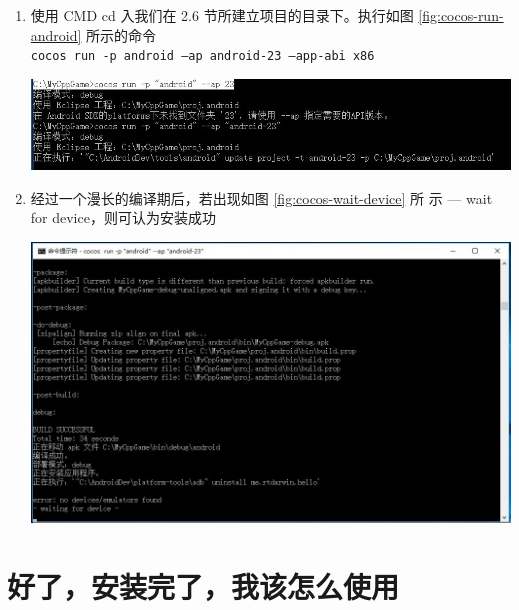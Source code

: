 \documentclass[a4paper, 10pt]{article}
\newcommand{\inlinecode}[1]{\colorbox{inlinecodecolor}{\texttt{#1}}}
\begin{document}
\begin{enumerate}
\item 使用 CMD cd 入我们在 2.6 节所建立项目的目录下。执行如图
  \ref{fig:cocos-run-android} 所示的命令\\
  \inlinecode{cocos run -p android --ap android-23 --app-abi x86}

  \begin{center}
    \includegraphics*[width=.8\textwidth]{images/cocos-run-android}
  \end{center}
  
\item 经过一个漫长的编译期后，若出现如图 \ref{fig:cocos-wait-device} 所
  示 --- wait for device，则可认为安装成功

  \begin{center}
    \includegraphics*[width=.8\textwidth]{images/cocos-wait-device}
  \end{center}
\end{enumerate}




\section{好了，安装完了，我该怎么使用}
\end{document}
